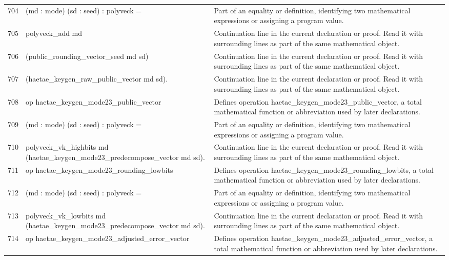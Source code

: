 \documentclass[10pt]{article}
\begin{document}
\begin{longtable}{r L{0.53\textwidth} L{0.37\textwidth}}
704 & {\ttfamily\scriptsize    (md : mode) (sd : seed) : polyveck =} & Part of an equality or definition, identifying two mathematical expressions or assigning a program value. \\
705 & {\ttfamily\scriptsize   polyveck\_add md} & Continuation line in the current declaration or proof.  Read it with surrounding lines as part of the same mathematical object. \\
706 & {\ttfamily\scriptsize     (public\_rounding\_vector\_seed md sd)} & Continuation line in the current declaration or proof.  Read it with surrounding lines as part of the same mathematical object. \\
707 & {\ttfamily\scriptsize     (haetae\_keygen\_raw\_public\_vector md sd).} & Continuation line in the current declaration or proof.  Read it with surrounding lines as part of the same mathematical object. \\
708 & {\ttfamily\scriptsize op haetae\_keygen\_mode23\_public\_vector} & Defines operation haetae\_keygen\_mode23\_public\_vector, a total mathematical function or abbreviation used by later declarations. \\
709 & {\ttfamily\scriptsize    (md : mode) (sd : seed) : polyveck =} & Part of an equality or definition, identifying two mathematical expressions or assigning a program value. \\
710 & {\ttfamily\scriptsize   polyveck\_vk\_highbits md (haetae\_keygen\_mode23\_predecompose\_vector md sd).} & Continuation line in the current declaration or proof.  Read it with surrounding lines as part of the same mathematical object. \\
711 & {\ttfamily\scriptsize op haetae\_keygen\_mode23\_rounding\_lowbits} & Defines operation haetae\_keygen\_mode23\_rounding\_lowbits, a total mathematical function or abbreviation used by later declarations. \\
712 & {\ttfamily\scriptsize    (md : mode) (sd : seed) : polyveck =} & Part of an equality or definition, identifying two mathematical expressions or assigning a program value. \\
713 & {\ttfamily\scriptsize   polyveck\_vk\_lowbits md (haetae\_keygen\_mode23\_predecompose\_vector md sd).} & Continuation line in the current declaration or proof.  Read it with surrounding lines as part of the same mathematical object. \\
714 & {\ttfamily\scriptsize op haetae\_keygen\_mode23\_adjusted\_error\_vector} & Defines operation haetae\_keygen\_mode23\_adjusted\_error\_vector, a total mathematical function or abbreviation used by later declarations. \\

\end{longtable}
\end{document}
